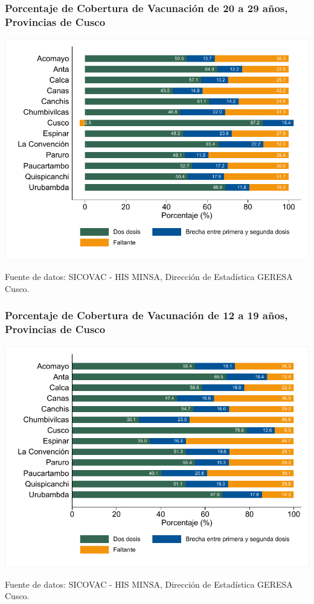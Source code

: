 \documentclass[xcolor=table]{beamer}
\begin{document}
\begin{frame}[label=vacunas_20]
	\frametitle{Porcentaje de Cobertura de Vacunación de 20 a 29 años, Provincias de Cusco}
	\vspace{-.5cm}
	\begin{center}
		\includegraphics[width=0.8\linewidth, trim={.2cm .5cm .2cm .2cm},clip]{../figuras/vacunacion_provincial_edad_3.pdf}
	\end{center}
	{\tiny Fuente de datos: SICOVAC - HIS MINSA, Dirección de Estadística GERESA Cusco. \\}
\hyperlink{cobertura_vacuna_provincias}{}

\end{frame}

\begin{frame}[label=vacunas_10]
	\frametitle{Porcentaje de Cobertura de Vacunación de 12 a 19 años, Provincias de Cusco}
	\vspace{-.5cm}
	\begin{center}
		\includegraphics[width=0.8\linewidth, trim={.2cm .5cm .2cm .2cm},clip]{../figuras/vacunacion_provincial_edad_2.pdf}
	\end{center}
	{\tiny Fuente de datos: SICOVAC - HIS MINSA, Dirección de Estadística GERESA Cusco. \\}
\hyperlink{cobertura_vacuna_provincias}{}
\end{frame}
\end{document}
